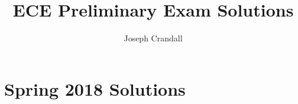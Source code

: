 
\usepackage{algorithm, algpseudocode, chemformula, color, gensymb, siunitx, soul, subfiles}
\usepackage[a4paper, total={7.5in, 10in}]{geometry}

\title{ECE Preliminary Exam Solutions}
\author{Joseph Crandall}


\maketitle

%

\section{Spring 2018 Solutions}



